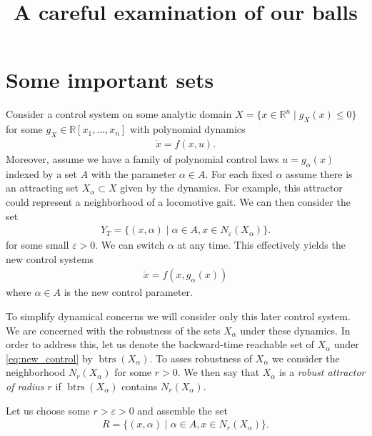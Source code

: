 \documentclass[12pt]{amsart}
\title{A careful examination of our balls}
\author{}
\date{} %
\DeclareMathOperator{\btrs}{btrs}
\begin{document}
\maketitle

\section{Some important sets}
\label{sec:sets}
Consider a control system on some analytic domain $X = \{ x \in \mathbb{R}^n \mid g_X(x) \leq 0 \}$ for some $g_X \in \mathbb{R}[x_1,\dots,x_n]$
with polynomial dynamics
\begin{align*}
	\dot{x} = f(x , u). 
\end{align*}
Moreover, assume we have a family of polynomial control laws $u = g_{\alpha}(x)$ indexed by a set $A$ with the parameter $\alpha \in A$.
For each fixed $\alpha$ assume there is an attracting set $X_\alpha \subset X$ given by the dynamics.
For example, this attractor could represent a neighborhood of a locomotive gait.
We can then consider the set
\begin{align*}
	Y_T = \{ (x,\alpha)  \mid \alpha \in A, x \in N_\varepsilon(X_{\alpha } ) \}.
\end{align*}
for some small $\varepsilon > 0$.
We can switch $\alpha$ at any time.  This effectively yields the new control systems
\begin{align}
	\dot{x} = f(x , g_\alpha(x) ) \label{eq:new_control}
\end{align}
where $\alpha \in A$ is the new control parameter.

To simplify dynamical concerns we will consider only this later control system.
We are concerned with the robustness of the sets $X_\alpha$ under these dynamics.
In order to address this, let us denote the backward-time reachable set of $X_\alpha$ under \eqref{eq:new_control} by $\btrs(X_\alpha)$.
To asses robustness of $X_\alpha$ we consider the neighborhood $N_r( X_\alpha)$ for some $r > 0$.
We then say that $X_\alpha$ is a \emph{robust attractor of radius $r$} if $\btrs(X_\alpha)$ contains $N_r(X_\alpha)$.

Let us choose some $r > \varepsilon > 0$ and assemble the set
\begin{align*}
	R = \{ (x,\alpha) \mid \alpha \in A , x \in N_r( X_\alpha) \}.
\end{align*}
\end{document}
